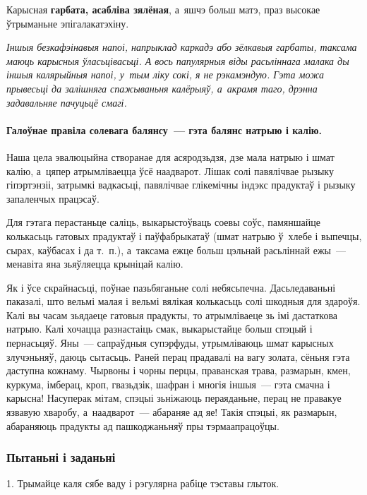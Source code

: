 Карысная \textbf{гарбата, асабліва зялёная}, а~яшчэ больш матэ, праз высокае ўтрыманьне эпігалакатэхіну. 

\emph{Іншыя безкафэінавыя напоі, напрыклад каркадэ або зёлкавыя гарбаты, таксама маюць карысныя ўласьцівасьці. А вось папулярныя віды расьліннага малака ды іншыя калярыйныя напоі, у~тым ліку сокі, я не рэкамэндую. Гэта можа прывесьці да залішняга спажываньня калёрыяў, а~акрамя таго, дрэнна задавальняе пачуцьцё смагі.}

\paragraph{Галоўнае правіла солевага балянсу~--- гэта балянс натрыю і калію.} Наша цела эвалюцыйна створанае для асяродзьдзя, дзе мала натрыю і шмат калію, а~цяпер атрымліваецца ўсё наадварот. Лішак солі павялічвае рызыку гіпэртэнзіі, затрымкі вадкасьці, павялічвае глікемічны індэкс прадуктаў і рызыку запаленчых працэсаў. 


Для гэтага перастаньце саліць, выкарыстоўваць соевы соўс, памяншайце колькасьць гатовых прадуктаў і паўфабрыкатаў (шмат натрыю ў~хлебе і выпечцы, сырах, каўбасах і да т.~п.), а~таксама ежце больш цэльнай расьліннай ежы~--- менавіта яна зьяўляецца крыніцай калію.

Як і ўсе скрайнасьці, поўнае пазьбяганьне солі небясьпечна. Дасьледаваньні паказалі, што вельмі малая і вельмі вялікая колькасьць солі шкодныя для здароўя. Калі вы часам зьядаеце гатовыя прадукты, то атрымліваеце зь імі дастаткова натрыю. Калі хочацца разнастаіць смак, выкарыстайце больш спэцый і пернасьцяў. Яны~--- сапраўдныя супэрфуды, утрымліваюць шмат карысных злучэньняў, даюць сытасьць. Раней перац прадавалі на вагу золата, сёньня гэта даступна кожнаму. Чырвоны і чорны перцы, праванская трава, размарын, кмен, куркума, імберац, кроп, гвазьдзік, шафран і многія іншыя~--- гэта смачна і карысна! Насуперак мітам, спэцыі зьніжаюць пераяданьне, перац не правакуе язвавую хваробу, а~наадварот~--- абараняе ад яе! Такія спэцыі, як размарын, абараняюць прадукты ад пашкоджаньняў пры тэрмаапрацоўцы.

\subsubsection{Пытаньні і заданьні}

1. Трымайце каля сябе ваду і рэгулярна рабіце тэставы глыток.

